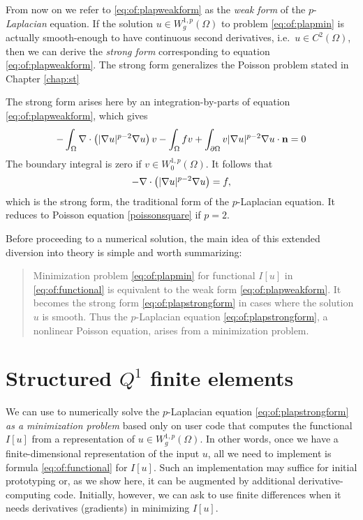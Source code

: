 From now on we refer to \eqref{eq:of:plapweakform} as the \emph{weak form} of the $p$-\emph{Laplacian} equation.  If the solution $u \in W_g^{1,p}(\Omega)$ to problem \eqref{eq:of:plapmin} is actually smooth-enough to have continuous second derivatives, i.e.~$u \in C^2(\Omega)$, then we can derive the \emph{strong form} corresponding to equation \eqref{eq:of:plapweakform}.  The strong form generalizes the Poisson problem stated in Chapter \ref{chap:st}

The strong form arises here by an integration-by-parts \citep{Evans2010} of equation \eqref{eq:of:plapweakform}, which gives
    $$-\int_\Omega \nabla\cdot\left(|\nabla u|^{p-2} \nabla u\right) v - \int_\Omega f v + \int_{\partial \Omega} v |\nabla u|^{p-2} \nabla u \cdot \mathbf{n} = 0$$
The boundary integral is zero if $v\in W_0^{1,p}(\Omega)$.  It follows that
\begin{equation}
- \nabla\cdot\left(|\nabla u|^{p-2} \nabla u\right) = f,
\label{eq:of:plapstrongform}
\end{equation}
which is the strong form, the traditional form of the $p$-Laplacian equation.  It reduces to Poisson equation \eqref{poissonsquare} if $p=2$.

Before proceeding to a numerical solution, the main idea of this extended diversion into theory is simple and worth summarizing:
\begin{quote}
Minimization problem \eqref{eq:of:plapmin} for functional $I[u]$ in \eqref{eq:of:functional} is equivalent to the weak form \eqref{eq:of:plapweakform}.  It becomes the strong form \eqref{eq:of:plapstrongform} in cases where the solution $u$ is smooth.  Thus the $p$-Laplacian equation \eqref{eq:of:plapstrongform}, a nonlinear Poisson equation, arises from a minimization problem.
\end{quote}


\section{Structured $Q^1$ finite elements}

We can use \PETSc to numerically solve the $p$-Laplacian equation \eqref{eq:of:plapstrongform} \emph{as a minimization problem} based only on user code that computes the functional $I[u]$ from a representation of $u \in W_g^{1,p}(\Omega)$.  In other words, once we have a finite-dimensional representation of the input $u$, all we need to implement is formula \eqref{eq:of:functional} for $I[u]$.  Such an implementation may suffice  for initial prototyping or, as we show here, it can be augmented by additional derivative-computing code.  Initially, however, we can ask \PETSc to use finite differences when it needs derivatives (gradients) in minimizing $I[u]$.


